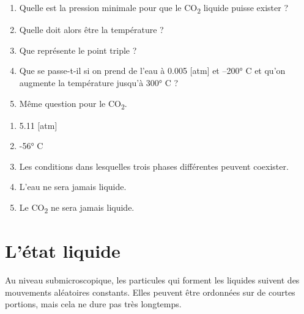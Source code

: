 \documentclass[
  11pt,
  a4paper,
  openany]{book}
\providecommand{\tightlist}{%
  \setlength{\itemsep}{0pt}\setlength{\parskip}{0pt}}
\begin{document}
\begin{Exercise}

\begin{enumerate}
\def\labelenumi{\arabic{enumi}.}
\tightlist
\item
  Quelle est la pression minimale pour que le CO\textsubscript{2} liquide puisse exister ?\\
\item
  Quelle doit alors être la température ?\\
\item
  Que représente le point triple ?\\
\item
  Que se passe-t-il si on prend de l'eau à 0.005 {[}atm{]} et --200° C et qu'on augmente la température jusqu'à 300° C ?\\
\item
  Même question pour le CO\textsubscript{2}.\\
\end{enumerate}

\end{Exercise}

\begin{Answer}

\begin{enumerate}
\def\labelenumi{\arabic{enumi}.}
\tightlist
\item
  5.11 {[}atm{]}
\item
  -56° C
\item
  Les conditions dans lesquelles trois phases différentes peuvent coexister.
\item
  L'eau ne sera jamais liquide.
\item
  Le CO\textsubscript{2} ne sera jamais liquide.
\end{enumerate}

\end{Answer}

\newpage

\section{L'état liquide}\label{luxe9tat-liquide}

Au niveau submicroscopique, les particules qui forment les liquides suivent des mouvements aléatoires constants. Elles peuvent être ordonnées sur de courtes portions, mais cela ne dure pas très longtemps.
\end{document}
